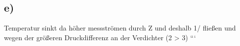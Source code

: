 

\subsection*{e)}
Temperatur sinkt da höher messströmen durch Z und deshalb 1/ fließen und wegen der größeren Druckdifferenz an der Verdichter (2 > 3)
```
